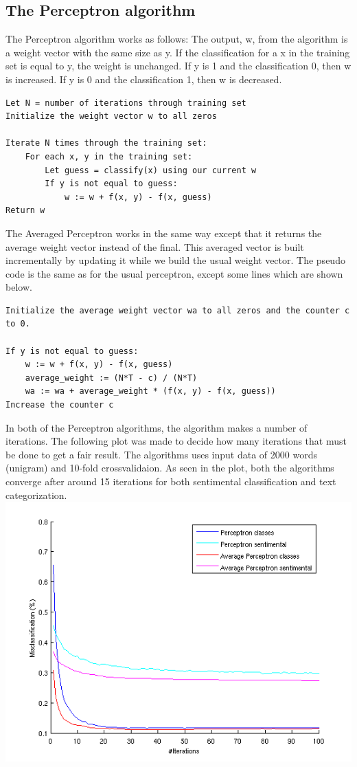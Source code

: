 \subsection{The Perceptron algorithm}
The Perceptron algorithm works as follows: 
The output, w, from the algorithm is a weight vector with the same size as y. If the classification for a x in the training set is equal to y, the weight is unchanged.
If y is 1 and the classification 0, then w is increased. If y is 0 and the classification 1, then w is decreased. \citep{perceptron_ai}
\begin{verbatim}
Let N = number of iterations through training set
Initialize the weight vector w to all zeros

Iterate N times through the training set:
    For each x, y in the training set:
        Let guess = classify(x) using our current w
        If y is not equal to guess:
            w := w + f(x, y) - f(x, guess)
Return w
\end{verbatim}
The Averaged Perceptron works in the same way except that it returns the average weight vector instead of the final.
This averaged vector is built incrementally by updating it while we build the usual weight vector. The pseudo code is the same as for the usual perceptron, except some lines which are shown below.
\begin{verbatim}
Initialize the average weight vector wa to all zeros and the counter c to 0.

If y is not equal to guess:
    w := w + f(x, y) - f(x, guess)
    average_weight := (N*T - c) / (N*T)
    wa := wa + average_weight * (f(x, y) - f(x, guess))
Increase the counter c
\end{verbatim}
In both of the Perceptron algorithms, the algorithm makes a number of iterations. The following plot was made to decide how many iterations that must be done to get a fair result. The algorithms uses input data of 2000 words (unigram) and 10-fold crossvalidaion. As seen in the plot, both the algorithms converge after around 15 iterations for both sentimental classification and text categorization.\\
\includegraphics[scale = 0.8]{fig/perceptron_2000words_unigram_10foldcv_classes-high_sentimental-low.png}
